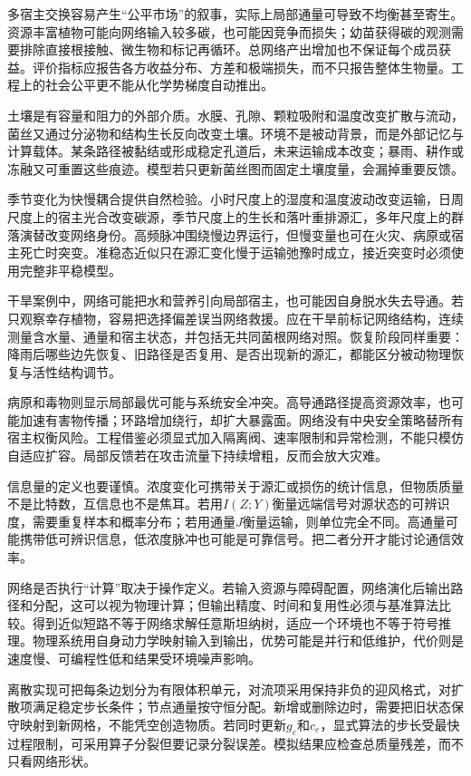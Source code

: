 多宿主交换容易产生“公平市场”的叙事，实际上局部通量可导致不均衡甚至寄生。资源丰富植物可能向网络输入较多碳，也可能因竞争而损失；幼苗获得碳的观测需要排除直接根接触、微生物和标记再循环。总网络产出增加也不保证每个成员获益。评价指标应报告各方收益分布、方差和极端损失，而不只报告整体生物量。工程上的社会公平更不能从化学势梯度自动推出。

土壤是有容量和阻力的外部介质。水膜、孔隙、颗粒吸附和温度改变扩散与流动，菌丝又通过分泌物和结构生长反向改变土壤。环境不是被动背景，而是外部记忆与计算载体。某条路径被黏结或形成稳定孔道后，未来运输成本改变；暴雨、耕作或冻融又可重置这些痕迹。模型若只更新菌丝图而固定土壤度量，会漏掉重要反馈。

季节变化为快慢耦合提供自然检验。小时尺度上的湿度和温度波动改变运输，日周尺度上的宿主光合改变碳源，季节尺度上的生长和落叶重排源汇，多年尺度上的群落演替改变网络身份。高频脉冲围绕慢边界运行，但慢变量也可在火灾、病原或宿主死亡时突变。准稳态近似只在源汇变化慢于运输弛豫时成立，接近突变时必须使用完整非平稳模型。

干旱案例中，网络可能把水和营养引向局部宿主，也可能因自身脱水失去导通。若只观察幸存植物，容易把选择偏差误当网络救援。应在干旱前标记网络结构，连续测量含水量、通量和宿主状态，并包括无共同菌根网络对照。恢复阶段同样重要：降雨后哪些边先恢复、旧路径是否复用、是否出现新的源汇，都能区分被动物理恢复与活性结构调节。

病原和毒物则显示局部最优可能与系统安全冲突。高导通路径提高资源效率，也可能加速有害物传播；环路增加绕行，却扩大暴露面。网络没有中央安全策略替所有宿主权衡风险。工程借鉴必须显式加入隔离阀、速率限制和异常检测，不能只模仿自适应扩容。局部反馈若在攻击流量下持续增粗，反而会放大灾难。

信息量的定义也要谨慎。浓度变化可携带关于源汇或损伤的统计信息，但物质质量不是比特数，互信息也不是焦耳。若用$I(Z;Y)$衡量远端信号对源状态的可辨识度，需要重复样本和概率分布；若用通量$J$衡量运输，则单位完全不同。高通量可能携带低可辨识信息，低浓度脉冲也可能是可靠信号。把二者分开才能讨论通信效率。

网络是否执行“计算”取决于操作定义。若输入资源与障碍配置，网络演化后输出路径和分配，这可以视为物理计算；但输出精度、时间和复用性必须与基准算法比较。得到近似短路不等于网络求解任意斯坦纳树，适应一个环境也不等于符号推理。物理系统用自身动力学映射输入到输出，优势可能是并行和低维护，代价则是速度慢、可编程性低和结果受环境噪声影响。

离散实现可把每条边划分为有限体积单元，对流项采用保持非负的迎风格式，对扩散项满足稳定步长条件；节点通量按守恒分配。新增或删除边时，需要把旧状态保守映射到新网格，不能凭空创造物质。若同时更新$g_e$和$c_e$，显式算法的步长受最快过程限制，可采用算子分裂但要记录分裂误差。模拟结果应检查总质量残差，而不只看网络形状。

